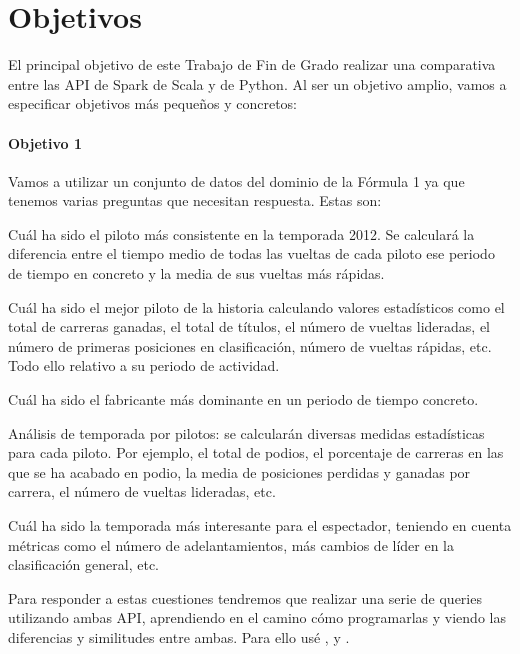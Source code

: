 \documentclass[12pt,twoside,titlepage]{report}
\newcommand\blankpage{%
    \newpage
    \null
    \thispagestyle{empty}%
    \newpage}
\begin{document}


\chapter{Objetivos}
\newpage

El principal objetivo de este Trabajo de Fin de Grado realizar una comparativa entre las API de Spark de Scala y de Python. Al ser un objetivo amplio, vamos a especificar objetivos más pequeños y concretos:


\subsubsection{Objetivo 1}

Vamos a utilizar un conjunto de datos del dominio de la Fórmula 1 ya que tenemos varias preguntas que necesitan respuesta. Estas son:

\begin{compactitem}
  \item Cuál ha sido el piloto más consistente en la temporada 2012. Se calculará la diferencia entre el tiempo medio de todas las vueltas de cada piloto ese periodo de tiempo en concreto y la media de sus vueltas más rápidas.
  \item Cuál ha sido el mejor piloto de la historia calculando valores estadísticos como el total de carreras ganadas, el total de títulos, el número de vueltas lideradas, el número de primeras posiciones en clasificación, número de vueltas rápidas, etc. Todo ello relativo a su periodo de actividad.
  \item Cuál ha sido el fabricante más dominante en un periodo de tiempo concreto.
  \item Análisis de temporada por pilotos: se calcularán diversas medidas estadísticas para cada piloto. Por ejemplo, el total de podios, el porcentaje de carreras en las que se ha acabado en podio, la media de posiciones perdidas y ganadas por carrera, el número de vueltas lideradas, etc.
  \item Cuál ha sido la temporada más interesante para el espectador, teniendo en cuenta métricas como el número de adelantamientos, más cambios de líder en la clasificación general, etc.
\end{compactitem}

Para responder a estas cuestiones tendremos que realizar una serie de queries utilizando ambas API, aprendiendo en el camino cómo programarlas y viendo las diferencias y similitudes entre ambas. Para ello usé \cite{sparkbook}, \cite{Spark} y \cite{PySpark}.
\end{document}
